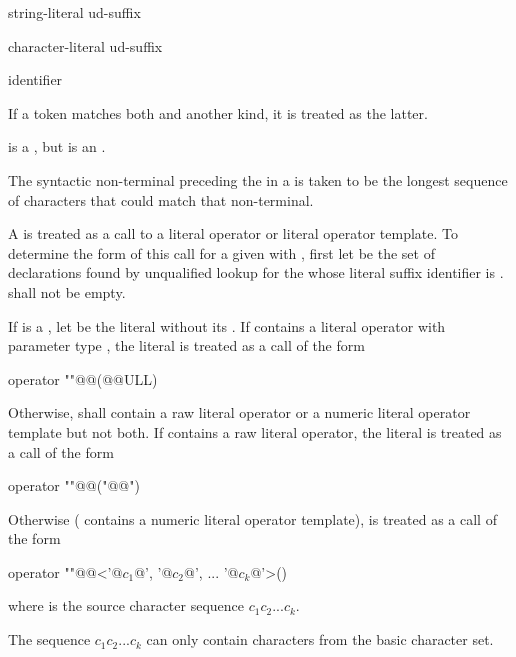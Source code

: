 \begin{bnf}
\br
    string-literal ud-suffix
\end{bnf}

\begin{bnf}
\br
    character-literal ud-suffix
\end{bnf}

\begin{bnf}
\br
    identifier
\end{bnf}

\pnum
If a token matches both  and another  kind, it
is treated as the latter.
\begin{example}
is a , but  is an
.
\end{example}
The syntactic non-terminal preceding the  in a
 is taken to be the longest sequence of
characters that could match that non-terminal.

\pnum
A  is treated as a call to a literal operator or
literal operator template.
To determine the form of this call for
a given  
with  ,
first let  be the set of declarations
found by unqualified lookup for the 
whose literal suffix identifier is .
 shall not be empty.

\pnum
If  is a , let  be the literal
without its . If  contains a literal operator with
parameter type , the literal  is treated as a call of
the form
\begin{codeblock}
operator ""@@(@@ULL)
\end{codeblock}
Otherwise,  shall contain a raw literal operator
or a numeric literal operator template but not both.
If  contains a raw literal operator,
the literal  is treated as a call of the form
\begin{codeblock}
operator ""@@("@@")
\end{codeblock}
Otherwise ( contains a numeric literal operator template),
 is treated as a call of the form
\begin{codeblock}
operator ""@@<'@$c_1$@', '@$c_2$@', ... '@$c_k$@'>()
\end{codeblock}
where  is the source character sequence $c_1c_2...c_k$.
\begin{note}
The sequence
$c_1c_2...c_k$ can only contain characters from the basic character set.
\end{note}

